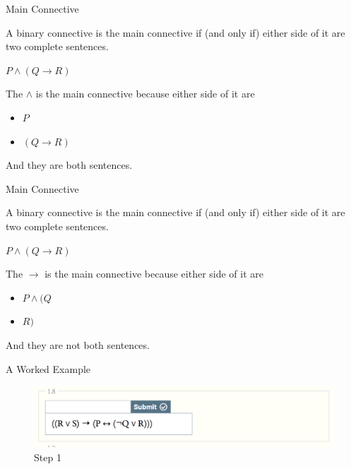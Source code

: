 \documentclass[
  ignorenonframetext,
]{beamer}
\providecommand{\tightlist}{%
  \setlength{\itemsep}{0pt}\setlength{\parskip}{0pt}}
\renewcommand{\,}{\text{, }}
\renewenvironment*{quote}	
	{\list{}{\rightmargin   \leftmargin} \item } 	
	{\endlist }
\begin{document}
\begin{frame}{Main Connective}
\protect\hypertarget{main-connective-1}{}

A binary connective is the main connective if (and only if) either side
of it are two complete sentences.

\begin{quote}
\(P \wedge (Q \rightarrow R)\)
\end{quote}

The \(\wedge\) is the main connective because either side of it are

\begin{itemize}
\tightlist
\item
  \(P\)
\item
  \((Q \rightarrow R)\)
\end{itemize}

And they are both sentences.

\end{frame}

\begin{frame}{Main Connective}
\protect\hypertarget{main-connective-2}{}

A binary connective is the main connective if (and only if) either side
of it are two complete sentences.

\begin{quote}
\(P \wedge (Q \rightarrow R)\)
\end{quote}

The \(\rightarrow\) is the main connective because either side of it are

\begin{itemize}
\tightlist
\item
  \(P \wedge (Q\)
\item
  \(R)\)
\end{itemize}

And they are not both sentences.

\end{frame}

\begin{frame}{A Worked Example}
\protect\hypertarget{a-worked-example}{}

\begin{figure}
\centering
\includegraphics{../images/class02/1.png}
\caption{Step 1}
\end{figure}

\end{frame}
\end{document}
